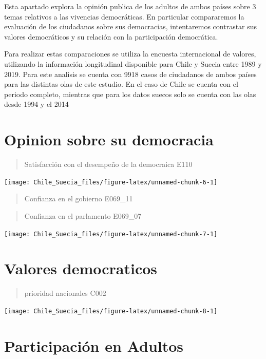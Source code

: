 \documentclass[12pt,twoside]{templates/facsothesis}
\begin{document}
Esta apartado explora la opinión publica de los adultos de ambos países sobre 3 temas relativos a las vivencias democráticas. En particular compararemos la evaluación de los ciudadanos sobre sus democracias, intentaremos contrastar sus valores democráticos y su relación con la participación democrática.

Para realizar estas comparaciones se utiliza la encuesta internacional de valores, utilizando la información longitudinal disponible para Chile y Suecia entre 1989 y 2019. Para este analisis se cuenta con 9918 casos de ciudadanos de ambos países para las distintas olas de este estudio. En el caso de Chile se cuenta con el periodo completo, mientras que para los datos suecos solo se cuenta con las olas desde 1994 y el 2014

\hypertarget{opinion-sobre-su-democracia}{%
\section{Opinion sobre su democracia}\label{opinion-sobre-su-democracia}}

\begin{quote}
Satisfacción con el desempeño de la democraica E110
\end{quote}

\texttt{[image: Chile\_Suecia\_files/figure-latex/unnamed-chunk-6-1]}

\begin{quote}
Confianza en el gobierno E069\_11
\end{quote}

\begin{quote}
Confianza en el parlamento E069\_07
\end{quote}

\texttt{[image: Chile\_Suecia\_files/figure-latex/unnamed-chunk-7-1]}

\hypertarget{valores-democraticos}{%
\section{Valores democraticos}\label{valores-democraticos}}

\begin{quote}
prioridad nacionales C002
\end{quote}

\texttt{[image: Chile\_Suecia\_files/figure-latex/unnamed-chunk-8-1]}

\hypertarget{participaciuxf3n-en-adultos}{%
\section{Participación en Adultos}\label{participaciuxf3n-en-adultos}}
\end{document}
